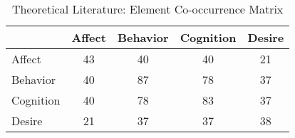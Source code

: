 \begin{table}
\begin{minipage}[t][\textheight][t]{\textwidth}

\caption{\label{tab:TheoriesElementCooccurrences}Theoretical Literature: Element Co-occurrence Matrix}
\begin{tabular}[t]{lcccc}
\toprule
  & Affect & Behavior & Cognition & Desire\\
\midrule
Affect & 43 & 40 & 40 & 21\\
Behavior & 40 & 87 & 78 & 37\\
Cognition & 40 & 78 & 83 & 37\\
Desire & 21 & 37 & 37 & 38\\
\bottomrule
\end{tabular}
\end{minipage}
\end{table}
